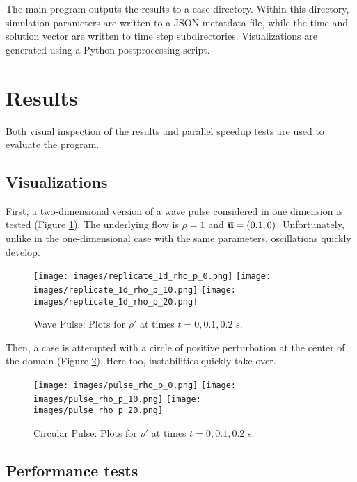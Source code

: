 \documentclass{article}
\begin{document}
The main program outputs the results to a case directory. Within this directory, simulation parameters are written to a JSON metatdata file, while the time and solution vector are written to time step subdirectories. Visualizations are generated using a Python postprocessing script.

\section{Results}

Both visual inspection of the results and parallel speedup tests are used to evaluate the program.

\subsection{Visualizations}

\FloatBarrier

First, a two-dimensional version of a wave pulse considered in one dimension is tested (Figure \ref{fig:replicate_1d_rho_p}). The underlying flow is $\overline{\rho} = 1$ and $\overline{\vb{u}} = (0.1, 0)$. Unfortunately, unlike in the one-dimensional case with the same parameters, oscillations quickly develop.

\begin{figure}[h!]
	\centering
	\texttt{[image: images/replicate\_1d\_rho\_p\_0.png]}
	\texttt{[image: images/replicate\_1d\_rho\_p\_10.png]}
	\texttt{[image: images/replicate\_1d\_rho\_p\_20.png]}
	\caption{Wave Pulse: Plots for $\rho'$ at times $t = 0, 0.1, 0.2$ s.}
	\label{fig:replicate_1d_rho_p}
\end{figure}

Then, a case is attempted with a circle of positive perturbation at the center of the domain (Figure \ref{fig:pulse_rho_p}). Here too, instabilities quickly take over.

\begin{figure}[h!]
	\centering
	\texttt{[image: images/pulse\_rho\_p\_0.png]}
	\texttt{[image: images/pulse\_rho\_p\_10.png]}
	\texttt{[image: images/pulse\_rho\_p\_20.png]}
	\caption{Circular Pulse: Plots for $\rho'$ at times $t = 0, 0.1, 0.2$ s.}
	\label{fig:pulse_rho_p}
\end{figure}

\FloatBarrier

\subsection{Performance tests}
\end{document}
